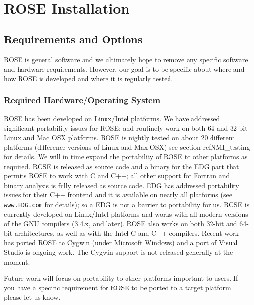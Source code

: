 \section{ROSE Installation}

\subsection{Requirements and Options}
\label{Requirements_Installation_Testing}
   ROSE is general software and we ultimately hope to remove any specific software
and hardware requirements.  However, our goal is to be specific about where and 
how ROSE is developed and where it is regularly tested.

\subsubsection{Required Hardware/Operating System}
   ROSE has been developed on Linux/Intel platforms. We have  
addressed significant portability issues for ROSE; and routinely work on
both 64 and 32 bit Linux and Mac OSX platforms. ROSE is nightly tested on 
about 20 different platforms (difference versions of Linux and Max OSX)
see section ref{NMI\_testing} for details.
We will in time expand the portability of ROSE to other platforms as 
required.  ROSE is released as source code and a binary for the EDG
part that permits ROSE to work with C and C++; all other support for
Fortran and binary analysis is fully released as source code.  EDG has 
addressed portability issues for their C++ frontend and it is available on 
nearly all platforms (see {\tt www.EDG.com} for details); so a EDG is not 
a barrier to portability for us.  ROSE is currently developed on
Linux/Intel platforms and works with all modern versions of the GNU compilers 
(3.4.x, and later). ROSE also works on both 32-bit and 64-bit architectures,
as well as with the Intel C and C++ compilers.  Recent work has ported ROSE
to Cygwin (under Microsoft Windows) and a port of Visual Studio is ongoing 
work.  The Cygwin support is not released generally at the moment.

Future work will focus on portability to other platforms important to users.
If you have a specific requirement for ROSE to be ported to a target platform
please let us know.

